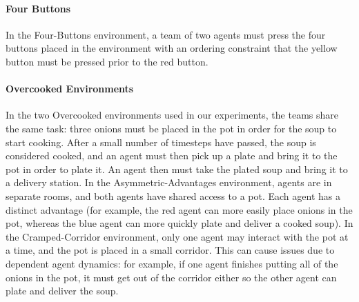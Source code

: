 \paragraph{Four Buttons} In the Four-Buttons environment, a team of two agents must press the four buttons placed in the environment with an ordering constraint that the yellow button must be pressed prior to the red button.


\paragraph{Overcooked Environments} In the two Overcooked environments used in our experiments, the teams share the same task: three onions must be placed in the pot in order for the soup to start cooking. After a small number of timesteps have passed, the soup is considered cooked, and an agent must then pick up a plate and bring it to the pot in order to plate it. An agent then must take the plated soup and bring it to a delivery station. In the Asymmetric-Advantages environment, agents are in separate rooms, and both agents have shared access to a pot. Each agent has a distinct advantage (for example, the red agent can more easily place onions in the pot, whereas the blue agent can more quickly plate and deliver a cooked soup). In the Cramped-Corridor environment, only one agent may interact with the pot at a time, and the pot is placed in a small corridor. This can cause issues due to dependent agent dynamics: for example, if one agent finishes putting all of the onions in the pot, it must get out of the corridor either so the other agent can plate and deliver the soup.







